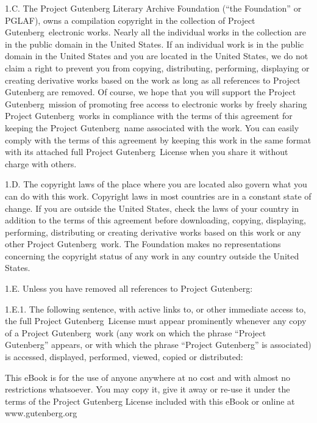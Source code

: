 1.C.  The Project Gutenberg Literary Archive Foundation (``the
Foundation'' or PGLAF), owns a compilation copyright in the collection
of Project Gutenberg\texttrademark\ electronic works.
Nearly all the individual works in the collection are in the public
domain in the United States.  If an individual work is in the public
domain in the United States and you are located in the United States,
we do not claim a right to prevent you from copying, distributing,
performing, displaying or creating derivative works based on the work
as long as all references to Project Gutenberg are removed.  Of
course, we hope that you will support the Project
Gutenberg\texttrademark\ mission of promoting free
access to electronic works by freely sharing Project
Gutenberg\texttrademark\ works in compliance with the
terms of this agreement for keeping the Project
Gutenberg\texttrademark\ name associated with the
work.  You can easily comply with the terms of this agreement by
keeping this work in the same format with its attached full Project
Gutenberg\texttrademark\ License when you share it
without charge with others.

1.D.  The copyright laws of the place where you are located also
govern what you can do with this work.  Copyright laws in most
countries are in a constant state of change.  If you are outside the
United States, check the laws of your country in addition to the terms
of this agreement before downloading, copying, displaying, performing,
distributing or creating derivative works based on this work or any
other Project Gutenberg\texttrademark\ work.  The
Foundation makes no representations concerning the copyright status of
any work in any country outside the United States.

1.E.  Unless you have removed all references to Project Gutenberg:

1.E.1.  The following sentence, with active links to, or other
immediate access to, the full Project
Gutenberg\texttrademark\ License must appear
prominently whenever any copy of a Project
Gutenberg\texttrademark\ work (any work on which the
phrase ``Project Gutenberg'' appears, or with which the phrase ``Project
Gutenberg'' is associated) is accessed, displayed, performed, viewed,
copied or distributed:

This eBook is for the use of anyone anywhere at no cost and with
almost no restrictions whatsoever.  You may copy it, give it away or
re-use it under the terms of the Project Gutenberg License included
with this eBook or online at www.gutenberg.org

